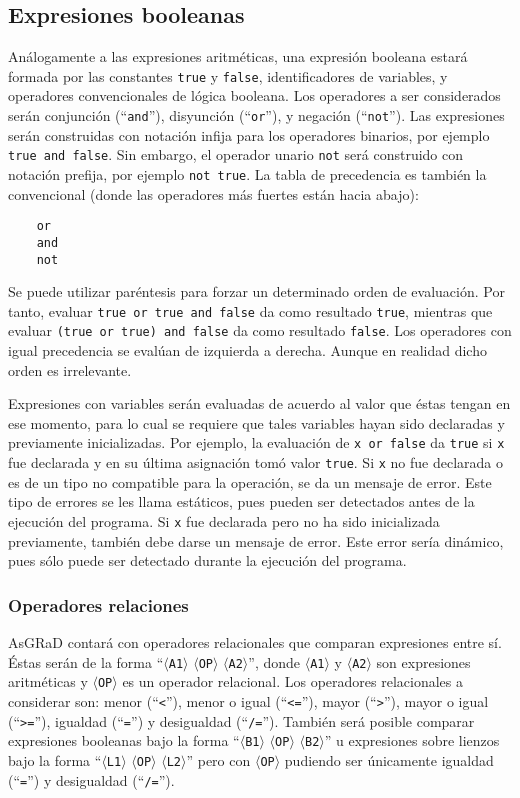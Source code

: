 \documentclass[letterpaper,11pt]{article}
\newcommand{\asgrad}{AsGRaD\xspace}
\newcommand{\general}[1]{$\langle$\texttt{#1}$\rangle$}
\newcommand{\qt}[1]{``\texttt{#1}''}
\begin{document}
\subsection{Expresiones booleanas}

Análogamente a las expresiones aritméticas, una expresión booleana estará formada por las constantes \texttt{true} y \texttt{false}, identificadores de variables, y operadores convencionales de lógica booleana. Los operadores a ser considerados serán conjunción (\qt{and}), disyunción (\qt{or}), y negación (\qt{not}). Las expresiones serán construidas con notación infija para los operadores binarios, por ejemplo \texttt{true and false}. Sin embargo, el operador unario \texttt{not} será construido con notación prefija, por ejemplo \texttt{not true}. La tabla de precedencia es también la convencional (donde las operadores más fuertes están hacia abajo):

\begin{lstlisting}
    or
    and
    not    
\end{lstlisting}

Se puede utilizar paréntesis para forzar un determinado orden de evaluación. Por tanto, evaluar \texttt{true or true and false} da como resultado \texttt{true}, mientras que evaluar \texttt{(true or true) and false} da como resultado \texttt{false}. Los operadores con igual precedencia se evalúan de izquierda a derecha. Aunque en realidad dicho orden es irrelevante.

Expresiones con variables serán evaluadas de acuerdo al valor que éstas tengan en ese momento, para lo cual se requiere que tales variables hayan sido declaradas y previamente inicializadas. Por ejemplo, la evaluación de \texttt{x or false} da \texttt{true} si \texttt{x} fue declarada y en su última asignación tomó valor \texttt{true}. Si \texttt{x} no fue declarada o es de un tipo no compatible para la operación, se da un mensaje de error. Este tipo de errores se les llama estáticos, pues pueden ser detectados antes de la ejecución del programa. Si \texttt{x} fue declarada pero no ha sido inicializada previamente, también debe darse un mensaje de error. Este error sería dinámico, pues sólo puede ser detectado durante la ejecución del programa.

\subsubsection{Operadores relaciones}

\asgrad contará con operadores relacionales que comparan expresiones entre sí. Éstas serán de la forma ``\general{A1} \general{OP} \general{A2}'', donde \general{A1} y \general{A2} son expresiones aritméticas y \general{OP} es un operador relacional. Los operadores relacionales a considerar son: menor (\qt{<}), menor o igual (\qt{<=}), mayor (\qt{>}), mayor o igual (\qt{>=}), igualdad (\qt{=}) y desigualdad (\qt{/=}). También será posible comparar expresiones booleanas bajo la forma ``\general{B1} \general{OP} \general{B2}'' u expresiones sobre lienzos bajo la forma ``\general{L1} \general{OP} \general{L2}'' pero con \general{OP} pudiendo ser únicamente igualdad (\qt{=}) y desigualdad (\qt{/=}).
\end{document}
